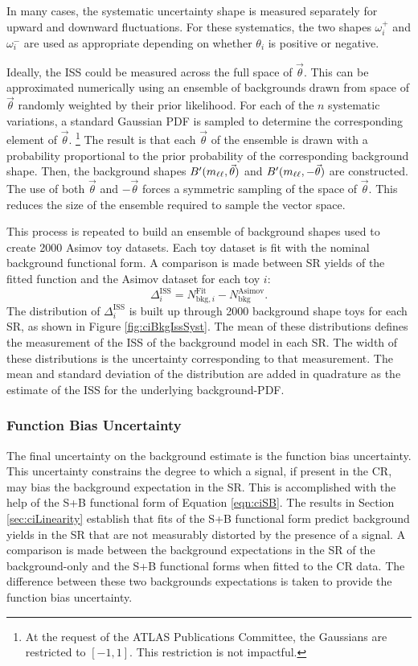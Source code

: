 In many cases, the systematic uncertainty shape is measured separately for upward and downward fluctuations.
For these systematics, the two shapes $\omega^+_i$ and $\omega^-_i$ are used as appropriate depending on whether $\theta_i$ is positive or negative.

Ideally, the ISS could be measured across the full space of $\vec{\theta}$.
This can be approximated numerically using an ensemble of backgrounds drawn from space of $\vec{\theta}$ randomly weighted by their prior likelihood.
For each of the $n$ systematic variations, a standard Gaussian PDF is sampled to determine the corresponding element of $\vec{\theta}$. \footnote{At the request of the ATLAS Publications Committee, the Gaussians are restricted to $[-1,1]$. This restriction is not impactful.}
The result is that each $\vec{\theta}$ of the ensemble is drawn with a probability proportional to the prior probability of the corresponding background shape.
Then, the background shapes $B'(m_{\ell\ell},\vec{\theta})$ and $B'(m_{\ell\ell},-\vec{\theta})$ are constructed.
The use of both $\vec{\theta}$ and $-\vec{\theta}$ forces a symmetric sampling of the space of $\vec{\theta}$. 
This reduces the size of the ensemble required to sample the vector space.

This process is repeated to build an ensemble of background shapes used to create 2000 Asimov toy datasets.
Each toy dataset is fit with the nominal background functional form.
A comparison is made between SR yields of the fitted function and the Asimov dataset for each toy $i$:
\begin{equation*}
    \Delta_i^\text{ISS}=N_{\text{bkg},i}^\text{Fit}-N_\text{bkg}^\text{Asimov}.
\end{equation*}
The distribution of $\Delta_i^\text{ISS}$ is built up through 2000 background shape toys for each SR, as shown in Figure \ref{fig:ciBkgIssSyst}.
The mean of these distributions defines the measurement of the ISS of the background model in each SR.
The width of these distributions is the uncertainty corresponding to that measurement.
The mean and standard deviation of the distribution are added in quadrature as the estimate of the ISS for the underlying background-PDF.

\subsubsection{Function Bias Uncertainty}

The final uncertainty on the background estimate is the function bias uncertainty.
This uncertainty constrains the degree to which a signal, if present in the CR, may bias the background expectation in the SR.
This is accomplished with the help of the S+B functional form of Equation \ref{eqn:ciSB}.
The results in Section \ref{sec:ciLinearity} establish that fits of the S+B functional form predict background yields in the SR that are not measurably distorted by the presence of a signal.
A comparison is made between the background expectations in the SR of the background-only and the S+B functional forms when fitted to the CR data.
The difference between these two backgrounds expectations is taken to provide the function bias uncertainty.

